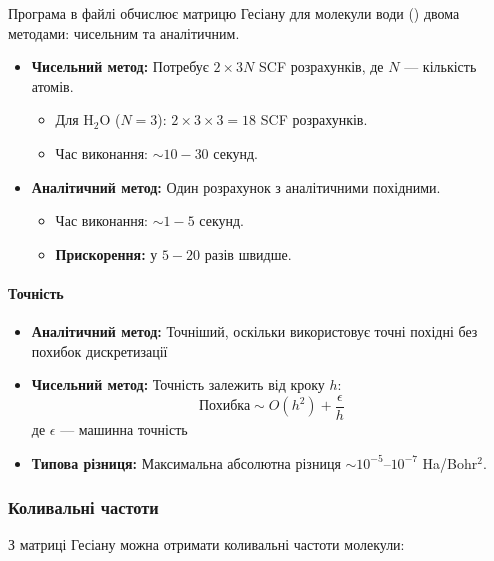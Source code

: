 Програма в файлі  обчислює матрицю Гесіану для молекули води () двома методами: чисельним та аналітичним.

\begin{itemize}
    \item \textbf{Чисельний метод:} Потребує $2 \times 3N$ SCF розрахунків, де $N$ --- кількість атомів.
    \begin{itemize}
        \item Для H$_2$O ($N=3$): $2 \times 3 \times 3 = 18$ SCF розрахунків.
        \item Час виконання: $\sim 10 - 30$ секунд.
    \end{itemize}

    \item \textbf{Аналітичний метод:} Один розрахунок з аналітичними похідними.
    \begin{itemize}
        \item Час виконання: $\sim 1 - 5$ секунд.
        \item \textbf{Прискорення:} у $5 - 20$ разів швидше.
    \end{itemize}
\end{itemize}

\paragraph{Точність}

\begin{itemize}
    \item \textbf{Аналітичний метод:} Точніший, оскільки використовує точні похідні без похибок дискретизації

    \item \textbf{Чисельний метод:} Точність залежить від кроку $h$:
    \begin{equation}
        \text{Похибка} \sim O(h^2) + \frac{\epsilon}{h}
    \end{equation}
    де $\epsilon$ --- машинна точність

    \item \textbf{Типова різниця:} Максимальна абсолютна різниця $\sim 10^{-5}$--$10^{-7}$ Ha/Bohr$^2$.
\end{itemize}

\subsubsection{Коливальні частоти}

З матриці Гесіану можна отримати коливальні частоти молекули:

